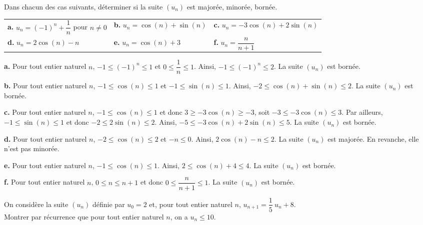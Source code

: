 \documentclass[11pt,fleqn]{book} %
\begin{document}
\begin{exercise}[topic=rec02]Dans chacun des cas suivants, déterminer si la suite $(u_n)$ est majorée, minorée, bornée.

\renewcommand{\arraystretch}{2.5}
\begin{tabularx}{\linewidth}{XXX}

\textbf{a.} $u_n= (-1)^n+\dfrac{1}{n}$ pour $n\neq 0$ & \textbf{b.} $u_n= \cos(n) + \sin (n)$ & \textbf{c.} $u_n= -3\cos(n)+2\sin(n)$ \\
\textbf{d.} $u_n= 2\cos(n)-n$ & \textbf{e.} $u_n = \cos (n) + 3$ & \textbf{f.} $u_n = \dfrac{n}{n+1}$ \\
\end{tabularx}\end{exercise}

\begin{solution} \textbf{a.} Pour tout entier naturel $n$, $-1 \leqslant (-1)^n \leqslant 1$ et $0\leqslant \dfrac{1}{n} \leqslant 1$. Ainsi, $-1 \leqslant (-1)^n \leqslant 2$. La suite $(u_n)$ est bornée.

\textbf{b.} Pour tout entier naturel $n$, $-1 \leqslant \cos(n) \leqslant 1$ et $-1\leqslant  \sin(n) \leqslant 1$. Ainsi, $-2 \leqslant \cos(n)+\sin(n) \leqslant 2$. La suite $(u_n)$ est bornée.

\textbf{c.} Pour tout entier naturel $n$, $-1 \leqslant \cos(n) \leqslant 1$ et donc $ 3 \geqslant -3 \cos(n) \geqslant -3$, soit $-3 \leqslant -3 \cos(n) \leqslant 3$. Par ailleurs, $-1\leqslant  \sin(n) \leqslant 1$ et donc $-2\leqslant 2\sin(n) \leqslant 2$. Ainsi, $-5 \leqslant -3\cos(n)+2\sin(n) \leqslant 5$. La suite $(u_n)$ est bornée.

\textbf{d.} Pour tout entier naturel $n$, $-2 \leqslant \cos (n) \leqslant 2$ et $-n \leqslant 0$. Ainsi, $2\cos(n) -n \leqslant 2$. La suite $(u_n)$ est majorée. En revanche, elle n'est pas minorée.

\textbf{e.} Pour tout entier naturel $n$, $-1 \leqslant \cos(n) \leqslant 1$. Ainsi, $2 \leqslant \cos(n)+4 \leqslant 4$. La suite $(u_n)$ est bornée.

\textbf{f.} Pour tout entier naturel $n$, $0 \leqslant n \leqslant n+1$ et donc $ 0\leqslant \dfrac{n}{n+1} \leqslant 1$. La suite $(u_n)$ est bornée.\end{solution}


\begin{exercise}[topic=rec02]  On considère la suite $(u_n)$ définie par $u_0=2$ et, pour tout entier naturel $n$, $u_{n+1}=\dfrac{1}{5}\ u_n + 8$. \\ Montrer par récurrence que pour tout entier naturel $n$, on a $u_n \leqslant 10$.\end{exercise}
\end{document}
